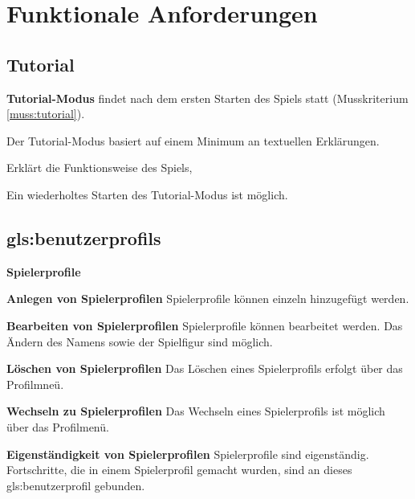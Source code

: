 \documentclass{scrartcl}
\begin{document}
\clearpage









\section{Funktionale Anforderungen}


\subsection{Tutorial} %
\label{sub:fa:tutorial}


\begin{falist}
	\item \label{fa:tutorial} \textbf{Tutorial-Modus} findet nach dem ersten Starten des Spiels statt (Musskriterium \ref{muss:tutorial}).
	\begin{falist} 
        \item \label{fa:tutorial_01}Der Tutorial-Modus basiert auf einem Minimum an textuellen Erklärungen.
        \item \label{fa:tutorial_02}Erklärt die Funktionsweise des Spiels,
		\item \label{fa:tutorial_03}Ein wiederholtes Starten des Tutorial-Modus ist möglich.
	\end{falist}
\end{falist}

\subsection{\glspl{gls:benutzerprofil}}
\begin{falist}[resume]
	\item \label{fa:spielerprofile} \textbf{Spielerprofile}
	\begin{falist}
		\item \label{fa:spielerprofile_anlegen} \textbf{Anlegen von Spielerprofilen} Spielerprofile können einzeln hinzugefügt werden.
		\item \label{fa:spielerprofile_bearbeiten} \textbf{Bearbeiten von Spielerprofilen} Spielerprofile können bearbeitet werden. Das Ändern des Namens sowie der Spielfigur sind möglich.
		\item \label{fa:spielerprofile_loeschen} \textbf{Löschen von Spielerprofilen} Das Löschen eines Spielerprofils erfolgt über das Profilmneü.
		\item \label{fa:spielerprofile_wechseln} \textbf{Wechseln zu Spielerprofilen} Das Wechseln eines Spielerprofils ist möglich über das Profilmenü.
		\item \label{fa:spielerprofile_separiert} \textbf{Eigenständigkeit von Spielerprofilen} Spielerprofile sind eigenständig. Fortschritte, die in einem Spielerprofil gemacht wurden, sind an dieses \gls{gls:benutzerprofil} gebunden.
	\end{falist}
\end{falist}
\end{document}
